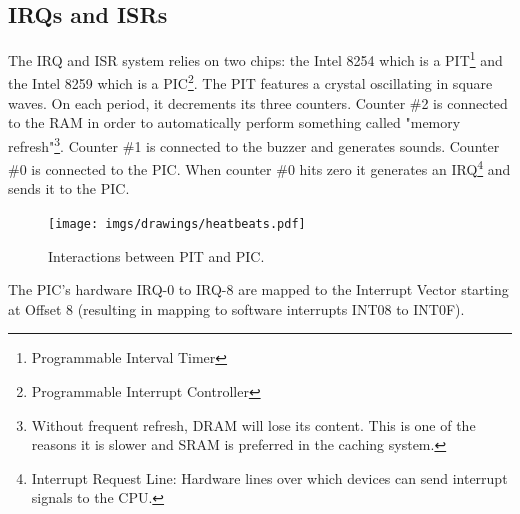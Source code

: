 \subsection{IRQs and ISRs}
The IRQ and ISR system relies on two chips: the Intel 8254 which is a PIT\footnote{Programmable Interval Timer} and the Intel 8259 which is a PIC\footnote{Programmable Interrupt Controller}. The PIT features a crystal oscillating in square waves. On each period, it decrements its three counters. Counter \#2 is connected to the RAM in order to automatically perform something called "memory refresh"\footnote{Without frequent refresh, DRAM will lose its content. This is one of the reasons it is slower and SRAM is preferred in the caching system.}. Counter \#1 is connected to the buzzer and generates sounds. Counter \#0 is connected to the PIC. When counter \#0 hits zero it generates an IRQ\footnote{Interrupt Request Line: Hardware lines over which devices can send interrupt signals to the CPU.} and sends it to the PIC.\\
\par
\begin{figure}[H]
  \centering
  \texttt{[image: imgs/drawings/heatbeats.pdf]}
  \caption{Interactions between PIT and PIC.}
\end{figure}
\par

The PIC's hardware IRQ-0 to IRQ-8 are mapped to the Interrupt Vector starting at Offset 8 (resulting in mapping to software interrupts INT08 to INT0F). \pagebreak


